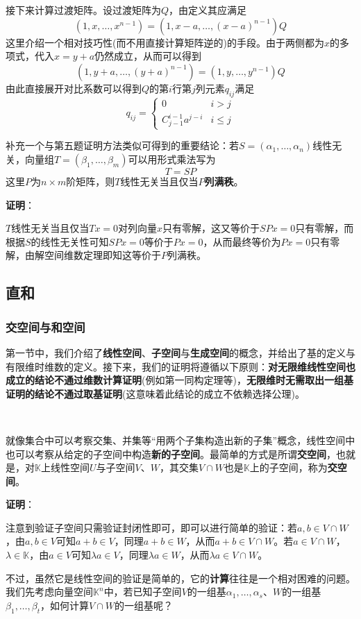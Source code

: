 \documentclass[a4paper,UTF8,fontset=windows,AutoFakeBold]{ctexart}
\newcommand*{\note}{\noindent *}
\newcommand{\proo}[1]{{\vspace{5pt}\kaishu\noindent\textbf{证明}：\vspace{-3pt}
\begin{compactitem}
    \item[] #1
\end{compactitem}
}}
\begin{document}
\begin{enumerate}
    接下来计算过渡矩阵。设过渡矩阵为$Q$，由定义其应满足
    $$(1,x,\dots,x^{n-1})=(1,x-a,\dots,(x-a)^{n-1})Q$$
    这里介绍一个相对技巧性(而不用直接计算矩阵逆的)的手段。由于两侧都为$x$的多项式，代入$x=y+a$仍然成立，从而可以得到
    $$(1,y+a,\dots,(y+a)^{n-1})=(1,y,\dots,y^{n-1})Q$$
    由此直接展开对比系数可以得到$Q$的第$i$行第$j$列元素$q_{ij}$满足
    $$q_{ij}=\begin{cases}0&i>j\\C_{j-1}^{i-1}a^{j-i}&i\le j\end{cases}$$
\end{enumerate}
\note 补充一个与第五题证明方法类似可得到的重要结论：若$S=(\alpha_1,\dots,\alpha_n)$线性无关，向量组$T=(\beta_1,\dots,\beta_m)$可以用形式乘法写为
$$T=SP$$
这里$P$为$n\times m$阶矩阵，则$T$线性无关当且仅当$P$\textbf{列满秩}。

\proo{
    $T$线性无关当且仅当$Tx=0$对列向量$x$只有零解，这又等价于$SPx=0$只有零解，而根据$S$的线性无关性可知$SPx=0$等价于$Px=0$，从而最终等价为$Px=0$只有零解，由解空间维数定理即知这等价于$P$列满秩。
}

\subsection{直和}
\subsubsection{交空间与和空间}
第一节中，我们介绍了\textbf{线性空间}、\textbf{子空间}与\textbf{生成空间}的概念，并给出了基的定义与有限维时维数的定义。接下来，我们的证明将遵循以下原则：\textbf{对无限维线性空间也成立的结论不通过维数计算证明}(例如第一同构定理等)，\textbf{无限维时无需取出一组基证明的结论不通过取基证明}(这意味着此结论的成立不依赖选择公理)。

\

就像集合中可以考察交集、并集等``用两个子集构造出新的子集''概念，线性空间中也可以考察从给定的子空间中构造\textbf{新的子空间}。最简单的方式是所谓\textbf{交空间}，也就是，对$\mathbb{K}$上线性空间$U$与子空间$V$、$W$，其交集$V\cap W$也是$\mathbb{K}$上的子空间，称为\textbf{交空间}。

\proo{
    注意到验证子空间只需验证封闭性即可，即可以进行简单的验证：若$a,b\in V\cap W$，由$a,b\in V$可知$a+b\in V$，同理$a+b\in W$，从而$a+b\in V\cap W$。若$a\in V\cap W$，$\lambda\in\mathbb{K}$，由$a\in V$可知$\lambda a\in V$，同理$\lambda a\in W$，从而$\lambda a\in V\cap W$。
}

不过，虽然它是线性空间的验证是简单的，它的\textbf{计算}往往是一个相对困难的问题。我们先考虑向量空间$\mathbb{K}^n$中，若已知子空间$V$的一组基$\alpha_1,\dots,\alpha_s$、$W$的一组基$\beta_1,\dots,\beta_t$，如何计算$V\cap W$的一组基呢？
\end{document}
